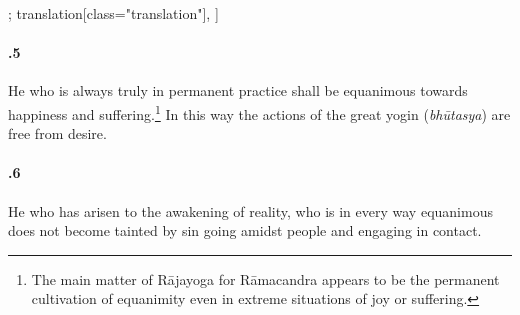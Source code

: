 \begin{alignment}[
  texts=edition[class="edition"];
  translation[class="translation"],
  ]
\begin{translation}
\begin{tlate}[58_5]
\paragraph{.5} He who is always truly in permanent practice shall be equanimous towards happiness and suffering.\footnote{The main matter of Rājayoga for Rāmacandra appears to be the permanent cultivation of equanimity even in extreme situations of joy or suffering.} In this way the actions of the great yogin (\textit{bhūtasya}) are free from desire.
\end{tlate}
\begin{tlate}[58_6]
  \paragraph{.6} He who has arisen to the awakening of reality, who is in every way equanimous does not become tainted by sin going amidst people and engaging in contact.
  \end{tlate}
\flushpage 
  \end{translation}
\end{alignment}
\pagebreak %
